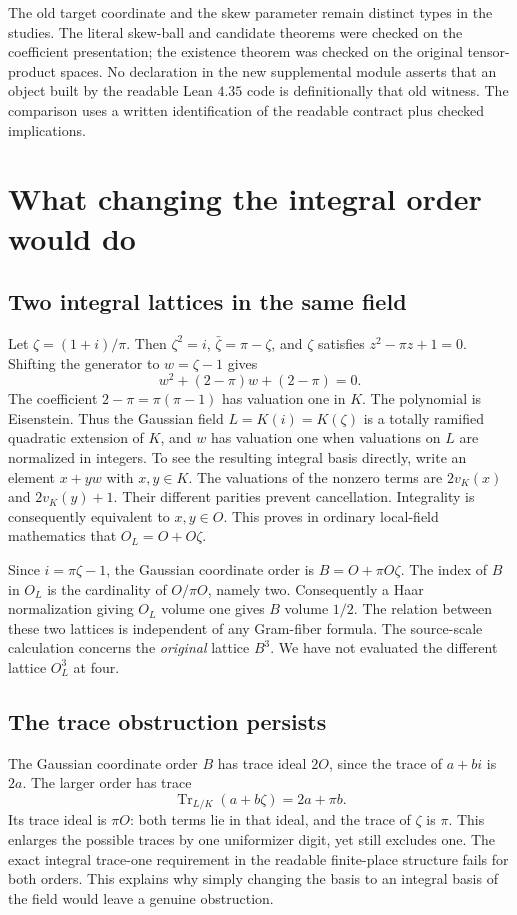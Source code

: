 \documentclass[12pt,letterpaper]{article}
\begin{document}
The old target coordinate and the skew parameter remain distinct types in the studies. The literal skew-ball and candidate theorems were checked on the coefficient presentation; the existence theorem was checked on the original tensor-product spaces. No declaration in the new supplemental module asserts that an object built by the readable Lean $4.35$ code is definitionally that old witness. The comparison uses a written identification of the readable contract plus checked implications.

\section{What changing the integral order would do}
\subsection{Two integral lattices in the same field}
Let $\zeta=(1+i)/\pi$. Then $\zeta^2=i$, $\bar\zeta=\pi-\zeta$, and $\zeta$ satisfies $z^2-\pi z+1=0$. Shifting the generator to $w=\zeta-1$ gives
\[
                 w^2+(2-\pi)w+(2-\pi)=0.
\]
The coefficient $2-\pi=\pi(\pi-1)$ has valuation one in $K$. The polynomial is Eisenstein. Thus the Gaussian field $L=K(i)=K(\zeta)$ is a totally ramified quadratic extension of $K$, and $w$ has valuation one when valuations on $L$ are normalized in integers. To see the resulting integral basis directly, write an element $x+yw$ with $x,y\in K$. The valuations of the nonzero terms are $2v_K(x)$ and $2v_K(y)+1$. Their different parities prevent cancellation. Integrality is consequently equivalent to $x,y\in O$. This proves in ordinary local-field mathematics that $O_L=O+O\zeta$.

Since $i=\pi\zeta-1$, the Gaussian coordinate order is $B=O+\pi O\zeta$. The index of $B$ in $O_L$ is the cardinality of $O/\pi O$, namely two. Consequently a Haar normalization giving $O_L$ volume one gives $B$ volume $1/2$. The relation between these two lattices is independent of any Gram-fiber formula. The source-scale calculation concerns the \emph{original} lattice $B^3$. We have not evaluated the different lattice $O_L^3$ at four.

\subsection{The trace obstruction persists}
The Gaussian coordinate order $B$ has trace ideal $2O$, since the trace of $a+bi$ is $2a$. The larger order has trace
\[
                  \operatorname{Tr}_{L/K}(a+b\zeta)=2a+\pi b.
\]
Its trace ideal is $\pi O$: both terms lie in that ideal, and the trace of $\zeta$ is $\pi$. This enlarges the possible traces by one uniformizer digit, yet still excludes one. The exact integral trace-one requirement in the readable finite-place structure fails for both orders. This explains why simply changing the basis to an integral basis of the field would leave a genuine obstruction.
\end{document}
